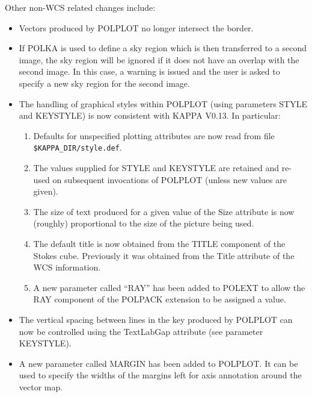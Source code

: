 \documentclass[twoside,11pt]{article}
\renewcommand{\_}{\texttt{\symbol{95}}}
\begin{document}
Other non-WCS related changes include:
\begin{itemize}
\item Vectors produced by POLPLOT no longer intersect the border.
\item If POLKA is used to define a sky region which is then transferred to
a second image, the sky region will be ignored if it does not have an overlap 
with the second image. In this case, a warning is issued and the user is
asked to specify a new sky region for the second image.
\item The handling of graphical styles within POLPLOT (using parameters
STYLE and KEYSTYLE) is now consistent with KAPPA V0.13. In particular:
\begin{enumerate}
\item Defaults for unspecified plotting attributes are now read from file 
\verb+$KAPPA_DIR/style.def+.
\item The values supplied for STYLE and KEYSTYLE are retained and re-used 
on subsequent invocations of POLPLOT (unless new values are given).
\item The size of text produced for a given value of the Size attribute is 
now (roughly) proportional to the size of the picture being used.
\item The default title is now obtained from the TITLE component of
the Stokes cube. Previously it was obtained from the Title attribute of
the WCS information.
\item A new parameter called ``RAY'' has been added to POLEXT to allow the RAY
component of the POLPACK extension to be assigned a value.
\end{enumerate}
\item The vertical spacing between lines in the key produced by POLPLOT can 
now be controlled using the TextLabGap attribute (see parameter KEYSTYLE).
\item A new parameter called MARGIN has been added to POLPLOT. It can be
used to specify the widths of the margins left for axis annotation around
the vector map.
\end{itemize}
\end{document}
